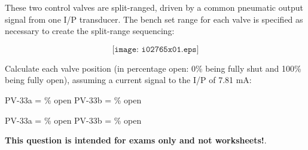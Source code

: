 

These two control valves are split-ranged, driven by a common pneumatic output signal from one I/P transducer.  The bench set range for each valve is specified as necessary to create the split-range sequencing:

$$\texttt{[image: i02765x01.eps]}$$

Calculate each valve position (in percentage open: 0\% being fully shut and 100\% being fully open), assuming a current signal to the I/P of 7.81 mA:

\vskip 20pt

\hskip 50pt PV-33a = \underbar{\hskip 50pt} \% open \hskip 60pt PV-33b = \underbar{\hskip 50pt} \% open







PV-33a =  \% open \hskip 100pt PV-33b =  \% open







{\bf This question is intended for exams only and not worksheets!}.


